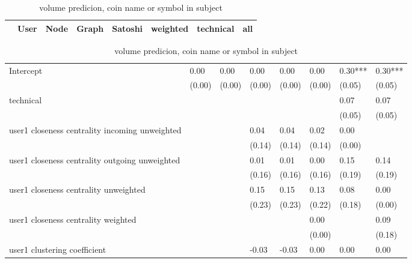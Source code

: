 \begin{table}
\caption{volume predicion, coin name or symbol in subject}
\begin{center}
\begin{tabular}{lccccccc}
\hline
                                               &   User  &   Node  &  Graph  & Satoshi & weighted & technical &   all    \\
\hline
\hline
\end{tabular}
\begin{tabular}{llllllll}
Intercept                                      & 0.00    & 0.00    & 0.00    & 0.00    & 0.00     & 0.30***   & 0.30***  \\
                                               & (0.00)  & (0.00)  & (0.00)  & (0.00)  & (0.00)   & (0.05)    & (0.05)   \\
technical                                      &         &         &         &         &          & 0.07      & 0.07     \\
                                               &         &         &         &         &          & (0.05)    & (0.05)   \\
user1 closeness centrality incoming unweighted &         &         & 0.04    & 0.04    & 0.02     & 0.00      &          \\
                                               &         &         & (0.14)  & (0.14)  & (0.14)   & (0.00)    &          \\
user1 closeness centrality outgoing unweighted &         &         & 0.01    & 0.01    & 0.00     & 0.15      & 0.14     \\
                                               &         &         & (0.16)  & (0.16)  & (0.16)   & (0.19)    & (0.19)   \\
user1 closeness centrality unweighted          &         &         & 0.15    & 0.15    & 0.13     & 0.08      & 0.00     \\
                                               &         &         & (0.23)  & (0.23)  & (0.22)   & (0.18)    & (0.00)   \\
user1 closeness centrality weighted            &         &         &         &         & 0.00     &           & 0.09     \\
                                               &         &         &         &         & (0.00)   &           & (0.18)   \\
user1 clustering coefficient                   &         &         & -0.03   & -0.03   & 0.00     & 0.00      & 0.00     \\

\end{tabular}
\end{center}
\end{table}
